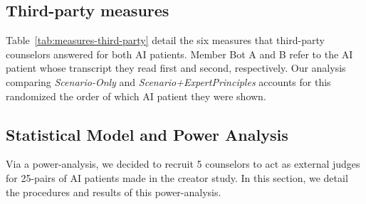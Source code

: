 \documentclass[11pt]{article}
\begin{document}
\subsection{Third-party measures} \label{appendix-sec:thirdparty-detailed-measures}

Table~\ref{tab:measures-third-party} detail the six measures that third-party counselors answered for both AI patients.  Member Bot A and B refer to the AI patient whose transcript they read first and second, respectively.  Our analysis comparing \textit{Scenario-Only} and \textit{Scenario+ExpertPrinciples} accounts for this randomized the order of which AI patient they were shown.  

\begin{table}[t]
    \centering
    \caption{Six measures used by third-party counselors to judge the AI patients from an unbiased, external perspective.  Although the six dimensions largely overlap with those used in the creator study, the wording needed to be rephrased for the third-party perspective.}
    \label{tab:measures-third-party}
\end{table}

\subsection{Statistical Model and Power Analysis} \label{appendix-sec:third-party-power-analysis}

Via a power-analysis, we decided to recruit 5 counselors to act as external judges for 25-pairs of AI patients made in the creator study. In this section, we detail the procedures and results of this power-analysis. 
\end{document}
